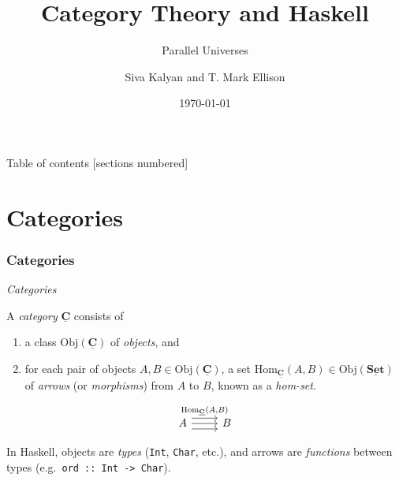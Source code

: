 \documentclass[10pt]{beamer}
\title{Category Theory and Haskell}
\subtitle{Parallel Universes}
\date{\today}
\author{Siva Kalyan and T. Mark Ellison}
\institute{Australian National University}
\newcommand{\Cat}[1]{\ensuremath{\underline{\mathbf{#1}}}}
\newcommand{\Obj}[1]{\ensuremath{\mathrm{Obj}(\Cat{#1})}}
\newcommand{\Hom}[3]{\ensuremath{\mathrm{Hom}_{\Cat{#1}}(#2,#3)}}
\theoremstyle{definition}
\theoremstyle{remark}
\numberwithin{equation}{section}
\begin{document}
\maketitle

\begin{frame}{Table of contents}
  [sections numbered]
  \tableofcontents[hideallsubsections]
\end{frame}

\section{Categories}

\begin{frame}[fragile]
  \frametitle{Categories}

  \emph{Categories}

  A \emph{category} $\Cat{C}$ consists of
  \begin{enumerate}
  \item a class $\Obj{C}$ of \emph{objects}, and
  \item for each pair of objects $A,B \in \Obj{C}$, a set $\Hom{C}{A}{B} \in
    \Obj{Set}$ of \emph{arrows} (or \emph{morphisms}) from $A$ to $B$, known as
    a \emph{hom-set}.
  \end{enumerate}\vspace{-1.5\baselineskip}

  \[
    \begin{tikzcd}
      A \arrow[shift left=2]{r}{\Hom{C}{A}{B}} \arrow{r} \arrow[shift right=2]{r} & B
    \end{tikzcd}
  \]

  In Haskell, objects are \emph{types} (\texttt{Int}, \texttt{Char}, etc.),
  and arrows are \emph{functions} between types (e.g.\ \texttt{ord :: Int ->
    Char}).
\end{frame}
\end{document}
